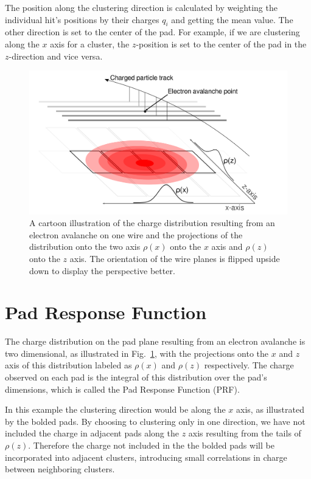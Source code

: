 \documentclass[review]{elsarticle}
\begin{document}
 The position along the clustering direction is calculated by weighting the individual hit's positions by their charges $q_i$ and getting the mean value. The other direction is set to the center of the pad. For example, if we are clustering along the $x$ axis for a cluster, the $z$-position is set to the center of the pad in the $z$-direction and vice versa. 
 


\begin{figure}[ht!]
\includegraphics[width=\linewidth]{padsat_Large}
\caption{A cartoon illustration of the charge distribution resulting from an electron avalanche on one wire and the projections of the distribution onto the two axis $\rho(x)$ onto the $x$ axis and $\rho(z)$ onto the $z$ axis. The orientation of the wire planes is flipped upside down to display the perspective better.}
\label{fig:prf}
\end{figure}

\section{Pad Response Function}
The charge distribution on the pad plane resulting from an electron avalanche is two dimensional, as illustrated in Fig.~\ref{fig:prf}, with the projections onto the $x$ and $z$ axis of this distribution labeled as $\rho(x)$ and $\rho(z)$ respectively. The charge observed on each pad is the integral of this distribution over the pad's dimensions, which is called the Pad Response Function (PRF).

In this example the clustering direction would be along the $x$ axis, as illustrated by the bolded pads. By choosing to clustering only in one direction, we have not included the charge in adjacent pads along the $z$ axis resulting from the tails of $\rho(z)$. Therefore the charge not included in the the bolded pads will be incorporated into adjacent clusters, introducing small correlations in charge between neighboring clusters. 
\end{document}
